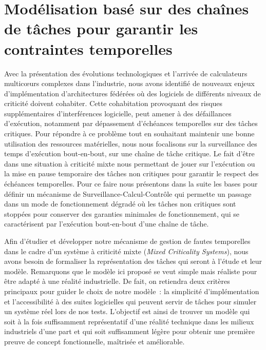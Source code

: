 \documentclass[french, a4paper, 11pt, twoside, pdftex]{StyleThese}
\begin{document}

\section[Modélisation basé sur des chaînes de tâches ]{Modélisation basé sur des chaînes de tâches pour \mbox{garantir} les contraintes temporelles}

    Avec la présentation des évolutions technologiques et l'arrivée de calculateurs multicœurs complexes dans l'industrie, nous avons identifié de nouveaux enjeux d'implémentation d'architectures fédérées où des logiciels de différents niveaux de criticité doivent cohabiter. Cette cohabitation provoquant des risques supplémentaires d'interférences logicielle, peut amener à des défaillances d'exécution, notamment par dépassement d'échéances temporelles sur des tâches critiques. Pour répondre à ce problème tout en souhaitant maintenir une bonne utilisation des ressources matérielles, nous nous focalisons sur la surveillance des temps d'exécution bout-en-bout, sur une chaîne de tâche critique. Le fait d'être dans une situation à criticité mixte nous permettant de jouer sur l'exécution ou la mise en pause temporaire des tâches non critiques pour garantir le respect des échéances temporelles. Pour ce faire nous présentons dans la suite les bases pour définir un mécanisme de Surveillance-Calcul-Contrôle qui permette un passage dans un mode de fonctionnement dégradé où les tâches non critiques sont stoppées pour conserver des garanties minimales de fonctionnement, qui se caractérisent par l'exécution bout-en-bout d'une chaîne de tâche.
    
    Afin d'étudier et développer notre mécanisme de gestion de fautes temporelles dans le cadre d'un système à criticité mixte (\textit{Mixed Criticality Systems}), nous avons besoin de formaliser la représentation des tâches qui seront à l'étude et leur modèle. Remarquons que le modèle ici proposé se veut simple mais réaliste pour être adapté à une réalité industrielle. De fait, on retiendra deux critères principaux pour guider le choix de notre modèle~: la simplicité d'implémentation et l'accessibilité à des suites logicielles qui peuvent servir de tâches pour simuler un système réel lors de nos tests. L'objectif est ainsi de trouver un modèle qui soit à la fois suffisamment représentatif d'une réalité technique dans les milieux industriels d'une part et qui soit suffisamment légère pour obtenir une première preuve de concept fonctionnelle, maîtrisée et améliorable.
    
\end{document}
